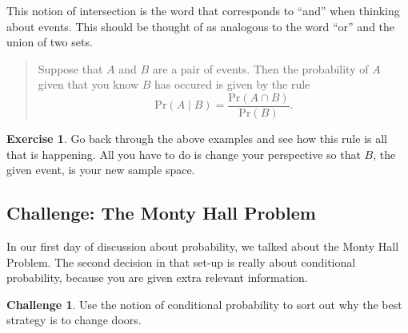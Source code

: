 \documentclass[12pt,letterpaper]{article}
\theoremstyle{definition}
\newtheorem{exercise}[question]{Exercise}
\newtheorem*{challenge}{Challenge}
\begin{document}
This notion of intersection is the word that corresponds to ``and'' when thinking about events.
This should be thought of as analogous to the word ``or'' and the union of two sets.


\begin{quotation}
Suppose that $A$ and $B$ are a pair of events.
Then the probability of $A$ given that you know $B$ has occured is given by the rule
\[
\mathrm{Pr}(A \mid B ) = \dfrac{ \mathrm{Pr}(A \cap B)}{\mathrm{Pr}(B)}.
\]
\end{quotation}

\begin{exercise}
Go back through the above examples and see how this rule is all that is happening.
All you have to do is change your perspective so that $B$, the given event, is your new sample space.
\end{exercise}


\subsection*{Challenge: The Monty Hall Problem}

In our first day of discussion about probability, we talked about the Monty Hall Problem.
The second decision in that set-up is really about conditional probability, because you are given extra relevant information.

\begin{challenge}
Use the notion of conditional probability to sort out why the best strategy is to change doors.
\end{challenge}

\end{document}
